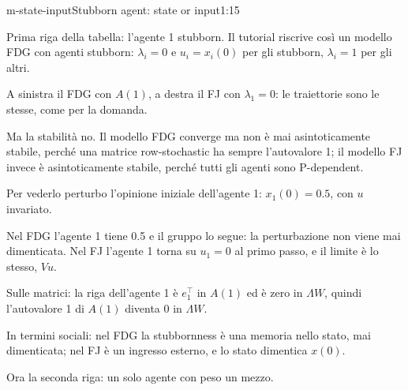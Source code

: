 \begin{slidedue}{m-state-input}{Stubborn agent: state or input}{1:15}
  \begin{discorso}
    \item Prima riga della tabella: l'agente 1 stubborn. Il tutorial riscrive così un modello FDG con agenti stubborn: $\lambda_i=0$ e $u_i=x_i(0)$ per gli stubborn, $\lambda_i=1$ per gli altri.
    \item A sinistra il FDG con $A(1)$, a destra il FJ con $\lambda_1=0$: le traiettorie sono le stesse, come per la domanda.
    \item Ma la stabilità no. Il modello FDG converge ma non è mai asintoticamente stabile, perché una matrice row-stochastic ha sempre l'autovalore 1; il modello FJ invece è asintoticamente stabile, perché tutti gli agenti sono P-dependent.
    \item \clic Per vederlo perturbo l'opinione iniziale dell'agente 1: $x_1(0)=0.5$, con $u$ invariato.
    \item Nel FDG l'agente 1 tiene 0.5 e il gruppo lo segue: la perturbazione non viene mai dimenticata. Nel FJ l'agente 1 torna su $u_1=0$ al primo passo, e il limite è lo stesso, $Vu$.
    \item Sulle matrici: la riga dell'agente 1 è $e_1^\top$ in $A(1)$ ed è zero in $\Lambda W$, quindi l'autovalore 1 di $A(1)$ diventa 0 in $\Lambda W$.
    \item In termini sociali: nel FDG la stubbornness è una memoria nello stato, mai dimenticata; nel FJ è un ingresso esterno, e lo stato dimentica $x(0)$.
    \item Ora la seconda riga: un solo agente con peso un mezzo.
  \end{discorso}
\end{slidedue}

